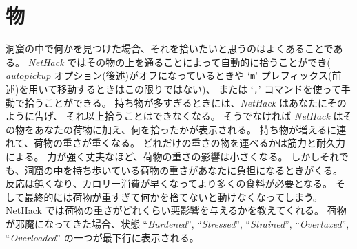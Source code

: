 \section{物}

洞窟の中で何かを見つけた場合、それを拾いたいと思うのはよくあることである。
{\it NetHack\/} ではその物の上を通ることによって自動的に拾うことができ(
{\it autopickup\/} オプション(後述)がオフになっているときや
`{\tt m}' プレフィックス(前述)を用いて移動するときはこの限りではない)、
または `{\tt ,}' コマンドを使って手動で拾うことができる。
持ち物が多すぎるときには、{\it NetHack\/} はあなたにそのように告げ、
それ以上拾うことはできなくなる。
そうでなければ {\it NetHack\/} はその物をあなたの荷物に加え、何を拾ったかが表示される。
持ち物が増えるに連れて、荷物の重さが重くなる。
どれだけの重さの物を運べるかは筋力と耐久力による。
力が強く丈夫なほど、荷物の重さの影響は小さくなる。
しかしそれでも、洞窟の中を持ち歩いている荷物の重さがあなたに負担になるときがくる。
反応は鈍くなり、カロリー消費が早くなってより多くの食料が必要となる。
そして最終的には荷物が重すぎて何かを捨てないと動けなくなってしまう。
NetHack では荷物の重さがどれくらい悪影響を与えるかを教えてくれる。
荷物が邪魔になってきた場合、状態
``{\it Burdened\/}'', ``{\it Stressed\/}'', ``{\it Strained\/}'',
``{\it Overtaxed\/}'', ``{\it Overloaded\/}''
の一つが最下行に表示される。

